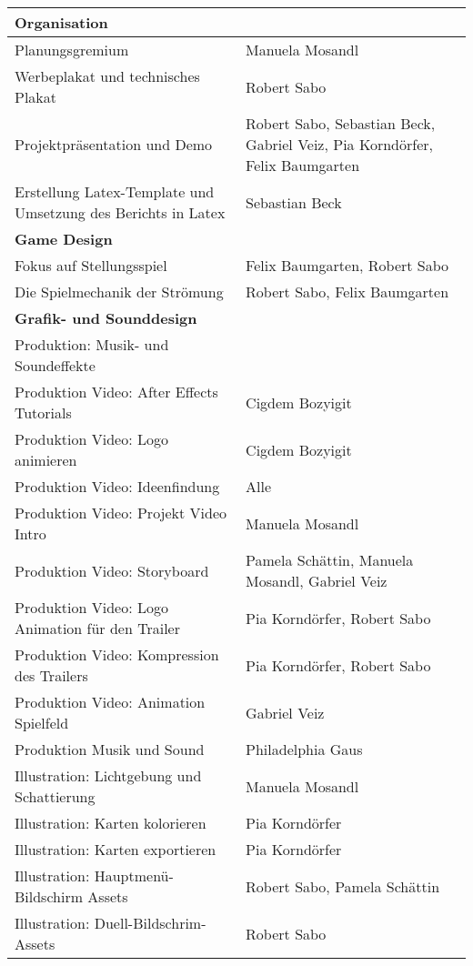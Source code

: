 \begin{longtable}{|p{8cm}|p{10cm}|}
\hline
\textbf{Organisation} &  \\ \hline
Planungsgremium & Manuela Mosandl \\ \hline
Werbeplakat und technisches Plakat & Robert Sabo \\ \hline
Projektpräsentation und Demo & Robert Sabo, Sebastian Beck, Gabriel Veiz, Pia Korndörfer, Felix Baumgarten \\ \hline
Erstellung Latex-Template und Umsetzung des Berichts in Latex & Sebastian Beck \\ \hline
\textbf{Game Design} &  \\ \hline
Fokus auf Stellungsspiel & Felix Baumgarten, Robert Sabo \\ \hline
Die Spielmechanik der Strömung & Robert Sabo, Felix Baumgarten \\ \hline
\textbf{Grafik- und Sounddesign} & \\ \hline
Produktion: Musik- und Soundeffekte & \\ \hline
Produktion Video: After Effects Tutorials & Cigdem Bozyigit \\ \hline
Produktion Video: Logo animieren & Cigdem Bozyigit \\ \hline
Produktion Video: Ideenfindung & Alle \\ \hline
Produktion Video: Projekt Video Intro & Manuela Mosandl \\ \hline
Produktion Video: Storyboard & Pamela Schättin, Manuela Mosandl, Gabriel Veiz \\ \hline
Produktion Video: Logo Animation für den Trailer & Pia Korndörfer, Robert Sabo \\ \hline
Produktion Video: Kompression des Trailers & Pia Korndörfer, Robert Sabo \\ \hline
Produktion Video: Animation Spielfeld & Gabriel Veiz \\ \hline
Produktion Musik und Sound & Philadelphia Gaus \\ \hline
Illustration: Lichtgebung und Schattierung & Manuela Mosandl \\ \hline
Illustration: Karten kolorieren & Pia Korndörfer \\ \hline
Illustration: Karten exportieren & Pia Korndörfer \\ \hline
Illustration: Hauptmenü-Bildschirm Assets & Robert Sabo, Pamela Schättin \\ \hline
Illustration: Duell-Bildschrim-Assets & Robert Sabo \\ \hline

\end{longtable}
